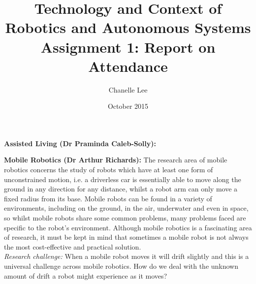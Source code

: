 \documentclass[11.5pt, twoside, a4paper]{article}
\begin{document}
\title{Technology and Context of Robotics and Autonomous Systems \\ Assignment 1: Report on Attendance}
\author{Chanelle Lee}
\date{October 2015}
\maketitle

\textbf{Assisted Living (Dr Praminda Caleb-Solly):} 

\textbf{Mobile Robotics (Dr Arthur Richards):} The research area of mobile robotics concerns the study of robots which have at least one form of unconstrained motion, i.e. a driverless car is essentially able to move along the ground in any direction for any distance, whilst a robot arm can only move a fixed radius from its base. Mobile robots can be found in a variety of environments, including on the ground, in the air, underwater and even in space, so whilst mobile robots share some common problems, many problems faced are specific to the robot's environment. Although mobile robotics is a fascinating area of research, it must be kept in mind that sometimes a mobile robot is not always the most cost-effective and practical solution. \\
\emph{Research challenge:} When a mobile robot moves it will drift slightly and this is a universal challenge across mobile robotics. How do we deal with the unknown amount of drift a robot might experience as it moves?
\end{document}
